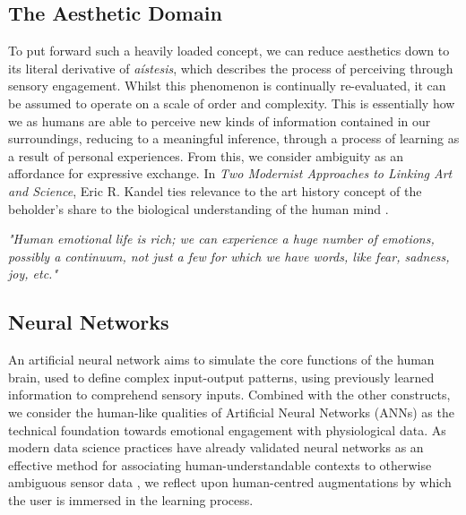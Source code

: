 
\subsection{The Aesthetic Domain}

To put forward such a heavily loaded concept, we can reduce aesthetics down to its literal derivative of \textit{aístesis}, which describes the process of perceiving through sensory engagement. Whilst this phenomenon is continually re-evaluated, it can be assumed to operate on a scale of order and complexity. This is essentially how we as humans are able to perceive new kinds of information contained in our surroundings, reducing to a meaningful inference, through a process of learning as a result of personal experiences. From this, we consider ambiguity as an affordance for expressive exchange. In \textit{Two Modernist Approaches to Linking Art and Science}, Eric R. Kandel ties relevance to the art history concept of the beholder's share to the biological understanding of the human mind \cite{kandel_two_2013}.

\textit{"Human emotional life is rich; we can experience a huge number of emotions, possibly a continuum, not just a few for which we have words, like fear, sadness, joy, etc."} \citeauthor{perlovsky_aesthetic_2014} \cite{perlovsky_aesthetic_2014}


\subsection{Neural Networks}

An artificial neural network aims to simulate the core functions of the human brain, used to define complex input-output patterns, using previously learned information to comprehend sensory inputs. Combined with the other constructs, we consider the human-like qualities of Artificial Neural Networks (ANNs) as the technical foundation towards emotional engagement with physiological data. As modern data science practices have already validated neural networks as an effective method for associating human-understandable contexts to otherwise ambiguous sensor data \cite{bota_review_2019}, we reflect upon human-centred augmentations by which the user is immersed in the learning process.

